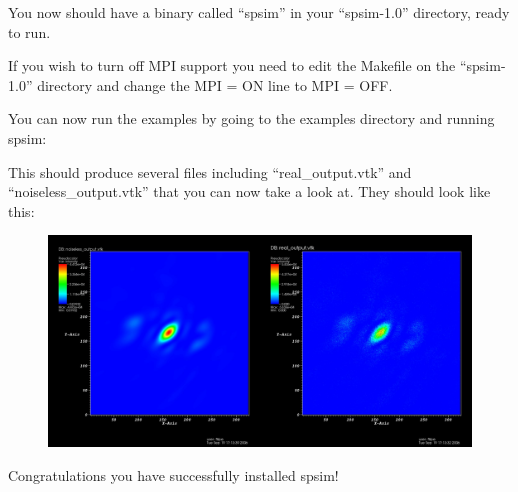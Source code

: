 \documentclass{report}
\begin{document}







You now should have a binary called ``spsim'' in your ``spsim-1.0'' directory, ready to run.


If you wish to turn off MPI support you need to edit the Makefile on the ``spsim-1.0'' directory and change the MPI = ON line
to MPI = OFF.


\vspace {4.0 in}

You can now run the examples by going to the examples directory and running spsim:



This should produce several files including ``real\_output.vtk'' and ``noiseless\_output.vtk'' that you can now take a look at.
They should look like this:

\begin{figure}[!h]
\centering
\includegraphics[scale=0.2]{example.png}
\label{ewald-construction}
\end{figure}

Congratulations you have successfully installed spsim!




\end{document}
